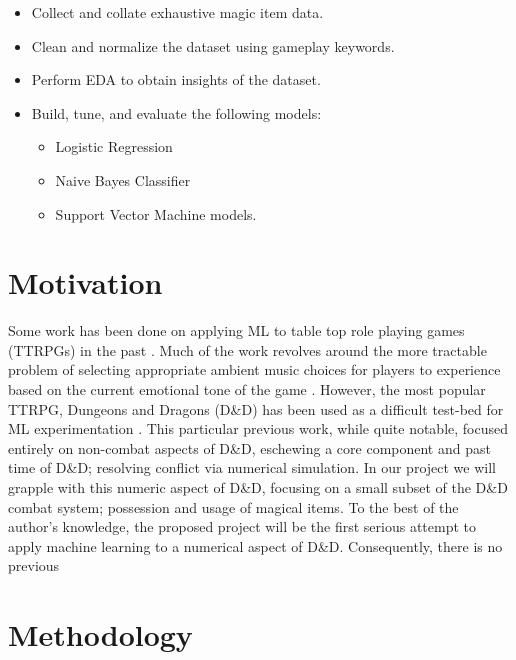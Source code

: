 \documentclass[12pt]{diazessay}
\begin{document}
\begin{itemize}
	
	\item Collect and collate exhaustive magic item data.
	\item Clean and normalize the dataset using gameplay keywords.
	\item Perform EDA to obtain insights of the dataset.
	\item Build, tune, and evaluate the following models:
	\begin{itemize}
		\item Logistic Regression
		\item Naive Bayes Classifier
		\item Support Vector Machine models.
	\end{itemize}

\end{itemize}

\clearpage


\section*{Motivation}

Some work has been done on applying ML to table top role playing games (TTRPGs) in the past \cite{rameshkumar-bailey-2020-storytelling, macinnes2019d, cavanaugh2016machine, faria2019adaptive, riedl2013interactive}.
Much of the work revolves around the more tractable problem of selecting appropriate ambient music choices for players to experience based on the current emotional tone of the game \cite{ferreira2017mtg, risi2020increasing, padovani2017bardo, ferreira2020computer}.
However, the most popular TTRPG, Dungeons and Dragons (D\&D) has been used as a difficult test-bed for ML experimentation \cite{martin2018dungeons}.
This particular previous work, while quite notable, focused entirely on non-combat aspects of D\&D, eschewing a core component and past time of D\&D; resolving conflict via numerical simulation.
In our project we will grapple with this numeric aspect of D\&D, focusing on a small subset of the D\&D combat system; possession and usage of magical items.
To the best of the author's knowledge, the proposed project will be the first serious attempt to apply machine learning to a numerical aspect of D\&D.
Consequently, there is no previous 


\section*{Methodology}
\end{document}
